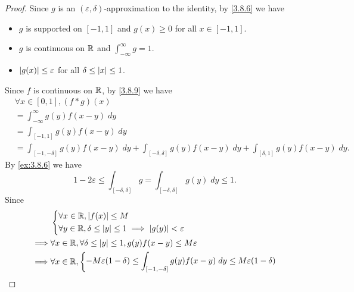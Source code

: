 \begin{proof}
  Since \(g\) is an \((\varepsilon, \delta)\)-approximation to the identity, by \cref{3.8.6} we have
  \begin{itemize}
    \item \(g\) is supported on \([-1, 1]\) and \(g(x) \geq 0\) for all \(x \in [-1, 1]\).
    \item \(g\) is continuous on \(\mathbb{R}\) and \(\int_{-\infty}^\infty g = 1\).
    \item \(\left\lvert g(x)\right\rvert \leq \varepsilon\) for all \(\delta \leq \left\lvert x\right\rvert \leq 1\).
  \end{itemize}
  Since \(f\) is continuous on \(\mathbb{R}\), by \cref{3.8.9} we have
  \begin{align*}
     & \forall x \in [0, 1], (f * g)(x)                                                                                                    \\
     & = \int_{-\infty}^\infty g(y) f(x - y) \; dy                                                                                         \\
     & = \int_{[-1, 1]} g(y) f(x - y) \; dy                                                                                                \\
     & = \int_{[-1, -\delta]} g(y) f(x - y) \; dy + \int_{[-\delta, \delta]} g(y) f(x - y) \; dy + \int_{[\delta, 1]} g(y) f(x - y) \; dy.
  \end{align*}
  By \cref{ex:3.8.6} we have
  \[
    1 - 2 \varepsilon \leq \int_{[-\delta, \delta]} g = \int_{[-\delta, \delta]} g(y) \; dy \leq 1.
  \]
  Since
  \begin{align*}
             & \begin{dcases}
                 \forall x \in \R, \abs{f(x)} \leq M \\
                 \forall y \in \R, \delta \leq \abs{y} \leq 1 \implies \abs{g(y)} < \varepsilon
               \end{dcases}                                                                         \\
    \implies & \forall x \in \R, \forall \delta \leq \abs{y} \leq 1, g(y) f(x - y) \leq M \varepsilon                                                                \\
    \implies & \forall x \in \R, \begin{dcases}
                                   -M \varepsilon (1 - \delta) \leq \int_{[-1, -\delta]} g(y) f(x - y) \; dy \leq M \varepsilon (1 - \delta) \\

\end{dcases}
\end{align*}
\end{proof}
